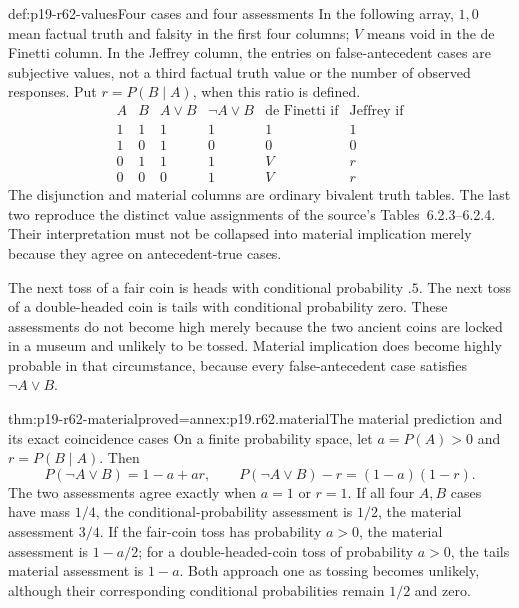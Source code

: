 \begin{hbconvention}{def:p19-r62-values}{Four cases and four assessments}
In the following array, \(1,0\) mean factual truth and falsity in the
first four columns; \(V\) means void in the de Finetti column. In the
Jeffrey column, the entries on false-antecedent cases are subjective values,
not a third factual truth value or the number of observed responses.
Put \(r=P(B\mid A)\), when this ratio is defined.
\[
\begin{array}{cc|c|c|c|c}
 A&B&A\lor B&\neg A\lor B&\text{de Finetti if}&\text{Jeffrey if}\\\hline
 1&1&1&1&1&1\\
 1&0&1&0&0&0\\
 0&1&1&1&V&r\\
 0&0&0&1&V&r
\end{array}
\]
The disjunction and material columns are ordinary bivalent truth tables.
The last two reproduce the distinct value assignments of the source's
Tables~6.2.3--6.2.4. Their interpretation must not be collapsed into
material implication merely because they agree on antecedent-true cases.
\end{hbconvention}

The next toss of a fair coin is heads with conditional probability \(.5\).
The next toss of a double-headed coin is tails with conditional probability
zero. These assessments do not become high merely because the two ancient
coins are locked in a museum and unlikely to be tossed. Material implication
does become highly probable in that circumstance, because every
false-antecedent case satisfies \(\neg A\lor B\).

\begin{hbtheorem}{thm:p19-r62-material}{proved=annex:p19.r62.material}{The material prediction and its exact coincidence cases}
On a finite probability space, let \(a=P(A)>0\) and
\(r=P(B\mid A)\). Then
\[
 P(\neg A\lor B)=1-a+ar,\qquad
 P(\neg A\lor B)-r=(1-a)(1-r).
\]
The two assessments agree exactly when \(a=1\) or \(r=1\).
If all four \(A,B\) cases have mass \(1/4\), the conditional-probability
assessment is \(1/2\), the material assessment \(3/4\).
If the fair-coin toss has probability \(a>0\), the material assessment
is \(1-a/2\); for a double-headed-coin toss of probability \(a>0\),
the tails material assessment is \(1-a\). Both approach one as tossing
becomes unlikely, although their corresponding conditional probabilities
remain \(1/2\) and zero.
\end{hbtheorem}

